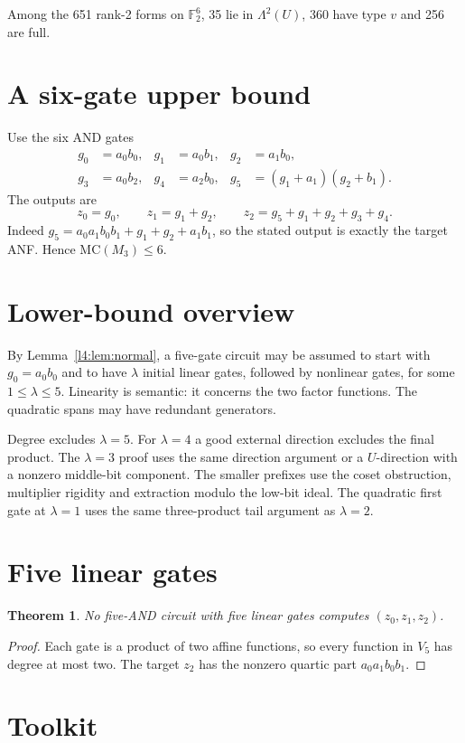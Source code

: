 \documentclass[11pt,a4paper]{article}
\theoremstyle{plain}
\newtheorem{theorem}{Theorem}
\theoremstyle{remark}
\theoremstyle{plain}
\newcommand{\F}{\mathbb F_2}
\newcommand{\Lam}{\Lambda^2}
\begin{document}
Among the 651 rank-2 forms on $\F^6$, 35 lie in $\Lam(U)$, 360 have type $v$ and 256 are full.


\section{A six-gate upper bound}\label{sec:upper}
Use the six AND gates
\begin{align*}
g_0&=a_0b_0,&g_1&=a_0b_1,&g_2&=a_1b_0,\\
g_3&=a_0b_2,&g_4&=a_2b_0,&g_5&=(g_1+a_1)(g_2+b_1).
\end{align*}
The outputs are
\[
 z_0=g_0,\qquad z_1=g_1+g_2,\qquad
 z_2=g_5+g_1+g_2+g_3+g_4.
\]
Indeed $g_5=a_0a_1b_0b_1+g_1+g_2+a_1b_1$, so the stated output is exactly the target ANF. Hence $\mathrm{MC}(M_3)\le6$.

\section{Lower-bound overview}\label{sec:overview}
By Lemma~\ref{l4:lem:normal}, a five-gate circuit may be assumed to start with $g_0=a_0b_0$ and to have $\lambda$ initial linear gates, followed by nonlinear gates, for some $1\le\lambda\le5$. Linearity is semantic: it concerns the two factor functions.
The quadratic spans may have redundant generators.

Degree excludes $\lambda=5$. For $\lambda=4$ a good external direction excludes the final product. The $\lambda=3$ proof uses the same direction argument or a $U$-direction with a nonzero middle-bit component. The smaller prefixes use the coset obstruction, multiplier rigidity and extraction modulo the low-bit ideal. The quadratic first gate at $\lambda=1$ uses the same three-product tail argument as $\lambda=2$.

\section{Five linear gates}\label{sec:lambda5}
\begin{theorem}\label{thm:lambda5}
No five-AND circuit with five linear gates computes $(z_0,z_1,z_2)$.
\end{theorem}
\begin{proof}
Each gate is a product of two affine functions, so every function in $V_5$ has degree at most two. The target $z_2$ has the nonzero quartic part $a_0a_1b_0b_1$.
\end{proof}

\section{Toolkit}\label{sec:toolkit}
\end{document}
